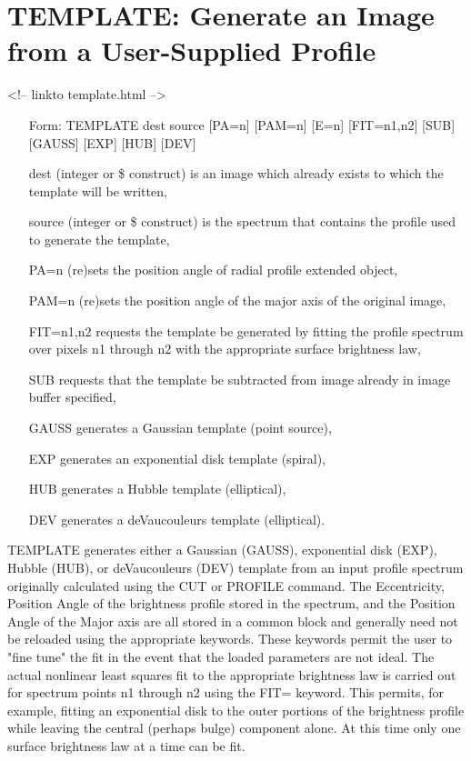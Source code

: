 \section{TEMPLATE: Generate an Image from a User-Supplied Profile}
\begin{rawhtml}
<!-- linkto template.html -->
\end{rawhtml}
\begin{itemize}
  \item[Form: TEMPLATE dest source {[PA=n]} {[PAM=n]} {[E=n]} {[FIT=n1,n2]}
       {[SUB]} {[GAUSS]} {[EXP]} {[HUB]} {[DEV]}\hfill]{}
  \item[dest]{(integer or \$ construct) is an image which already 
       exists to which the template will be written,}
  \item[source]{(integer or \$ construct) is the spectrum that
       contains the profile used to generate the template,}
  \item[PA=n]{(re)sets the position angle of radial profile
       extended object,}
  \item[PAM=n]{(re)sets the position angle of the major axis
       of the original image,}
  \item[FIT=n1,n2]{requests the template be generated by fitting
       the profile spectrum over pixels n1 through n2
       with the appropriate surface brightness law,}
  \item[SUB]{requests that the template be subtracted from
       image already in image buffer specified,}
  \item[GAUSS]{generates a Gaussian template (point source),}
  \item[EXP]{generates an exponential disk template (spiral),}
  \item[HUB]{generates a Hubble template (elliptical),}
  \item[DEV]{generates a deVaucouleurs template (elliptical).}
\end{itemize}

TEMPLATE generates either a Gaussian (GAUSS), exponential disk (EXP),
Hubble (HUB), or deVaucouleurs (DEV) template from an input profile spectrum
originally calculated using the CUT or PROFILE command.  The Eccentricity,
Position Angle of the brightness profile stored in the spectrum, and the
Position Angle of the Major axis are all stored in a common block and
generally need not be reloaded using the appropriate keywords.  These
keywords permit the user to "fine tune" the fit in the event that the
loaded parameters are not ideal.  The actual nonlinear least squares fit to
the appropriate brightness law is carried out for spectrum points n1
through n2 using the FIT= keyword.  This permits, for example, fitting an
exponential disk to the outer portions of the brightness profile while
leaving the central (perhaps bulge) component alone.  At this time only one
surface brightness law at a time can be fit.

